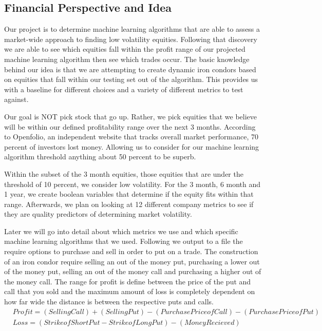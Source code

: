 \documentclass[paper=letter, fontsize=11pt]{scrartcl}
\numberwithin{equation}{section}		%
\numberwithin{figure}{section}			%
\numberwithin{table}{section}				%
\begin{document}
\begin{spacing}{2}
\subsection{Financial Perspective and Idea}
Our project is to determine machine learning algorithms that are able to assess a market-wide approach to finding low volatility equities. Following that discovery we are able to see which equities fall within the profit range of our projected machine learning algorithm then see which trades occur. The basic knowledge behind our idea is that we are attempting to create dynamic iron condors based on equities that fall within our testing set out of the algorithm. This provides us with a baseline for different choices and a variety of different metrics to test against.

Our goal is NOT pick stock that go up. Rather, we pick equities that we believe will be within our defined profitability range over the next 3 months. According to Openfolio, an independent website that tracks overall market performance, 70 percent of investors lost money. Allowing us to consider for our machine learning algorithm threshold anything about 50 percent to be superb\cite{Openfolio}.  

Within the subset of the 3 month equities, those equities that are under the threshold of 10 percent, we consider low volatility. For the 3 month, 6 month and 1 year, we create boolean variables that determine if the equity fits within that range. Afterwards, we plan on looking at 12 different company metrics to see if they are quality predictors of determining market volatility. 

Later we will go into detail about which metrics we use and which specific machine learning algorithms that we used. Following we output to a file the require options to purchase and sell in order to put on a trade. The construction of an iron condor require selling an out of the money put, purchasing a lower out of the money put, selling an out of the money call and purchasing a higher out of the money call. The range for profit is define between the price of the put and call that you sold and the maximum amount of loss is completely dependent on how far wide the distance is between the respective puts and calls.                                                                  
\begin{align*}
&Profit = (Selling Call) + (Selling Put) -(Purchase Price of Call) - (Purchase Price of Put)&\\
&Loss = (Strike of Short Put - Strike of Long Put) - (Money Recieved)& 
\end{align*}

\end{spacing}
\end{document}
